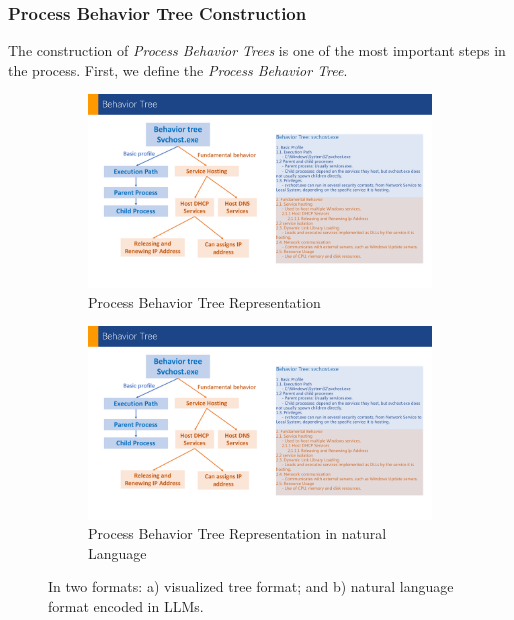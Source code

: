 \subsubsection{Process Behavior Tree Construction}
The construction of \textit{Process Behavior Trees} is one of the most important steps in the process.
First, we define the \textit{Process Behavior Tree}.
\begin{figure}[h]
    \centering
    \begin{subfigure}{0.45\textwidth}
      \includegraphics[width=1\textwidth]{figs/tree1.pdf}
      \caption{Process Behavior Tree Representation}
    \end{subfigure}
    \begin{subfigure}{0.45\textwidth}
    \includegraphics[width=1\textwidth]{figs/tree2.pdf}
    \caption{Process Behavior Tree Representation in natural Language}
    \end{subfigure}
    \vspace{-0.05in}
    \caption{In two formats: a) visualized tree format; and b) natural language format encoded in LLMs.}
    \label{fig:behavior-tree}
    \vspace{-0.15in}
    \end{figure}


